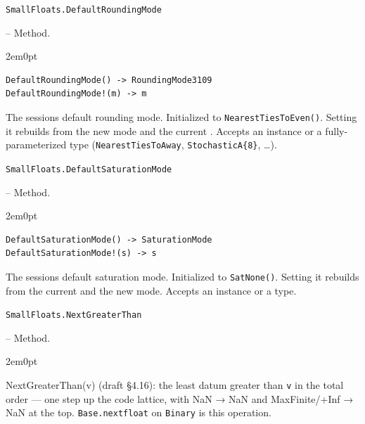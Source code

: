 \par\medskip\noindent\begin{minipage}{\linewidth}
\hypertarget{2306866772383893895}{\texttt{SmallFloats.DefaultRoundingMode}}  -- {Method.}
\nopagebreak
\begin{adjustwidth}{2em}{0pt}


\begin{verbatim}
DefaultRoundingMode() -> RoundingMode3109
DefaultRoundingMode!(m) -> m
\end{verbatim}

The session{\textquotesingle}s default rounding mode. Initialized to \texttt{NearestTiesToEven()}. Setting it rebuilds  from the new mode and the current . Accepts an instance or a fully-parameterized type (\texttt{NearestTiesToAway}, \texttt{StochasticA\{8\}}, …).



\end{adjustwidth}
\end{minipage}
\par\medskip

\par\medskip\noindent\begin{minipage}{\linewidth}
\hypertarget{1523060637620834303}{\texttt{SmallFloats.DefaultSaturationMode}}  -- {Method.}
\nopagebreak
\begin{adjustwidth}{2em}{0pt}


\begin{verbatim}
DefaultSaturationMode() -> SaturationMode
DefaultSaturationMode!(s) -> s
\end{verbatim}

The session{\textquotesingle}s default saturation mode. Initialized to \texttt{SatNone()}. Setting it rebuilds  from the current  and the new mode. Accepts an instance or a type.



\end{adjustwidth}
\end{minipage}
\par\medskip

\par\medskip\noindent\begin{minipage}{\linewidth}
\hypertarget{17514657111736502113}{\texttt{SmallFloats.NextGreaterThan}}  -- {Method.}
\nopagebreak
\begin{adjustwidth}{2em}{0pt}

NextGreaterThan(v) (draft §4.16): the least datum greater than \texttt{v} in the total order — one step up the code lattice, with NaN → NaN and MaxFinite/+Inf → NaN at the top. \texttt{Base.nextfloat} on \texttt{Binary} is this operation.



\end{adjustwidth}
\end{minipage}
\par\medskip

